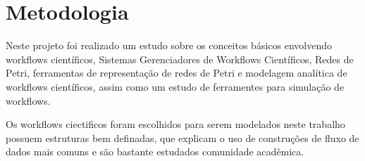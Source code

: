 \section{Metodologia}

	Neste projeto foi realizado um estudo sobre os conceitos básicos envolvendo workflows científicos, Sistemas  Gerenciadores de Workflows Científicos, Redes de Petri, ferramentas de representação de redes de Petri e modelagem analítica de workflows científicos, assim como um estudo de ferramentes para simulação de workflows.

	Os workflows ciectificos foram escolhidos para serem modelados neste trabalho possuem estruturas bem definadas, que explicam o uso de construções de fluxo de dados mais comuns e são bastante estudados comunidade acadêmica. 


	